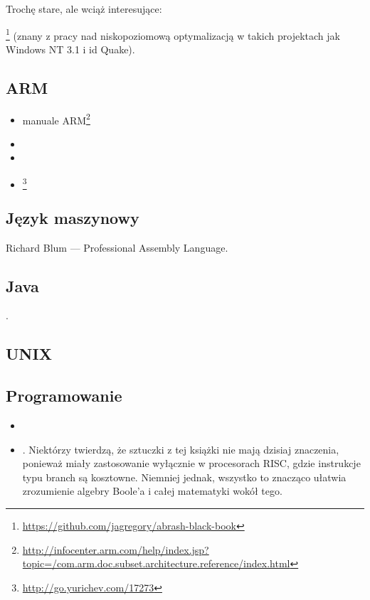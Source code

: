 Trochę stare, ale wciąż interesujące:

\MAbrash\footnote{\AlsoAvailableAs \url{https://github.com/jagregory/abrash-black-book}}
(znany z pracy nad niskopoziomową optymalizacją w takich projektach jak Windows NT 3.1 i id Quake).

\subsection{ARM}

\begin{itemize}
\item manuale ARM\footnote{\AlsoAvailableAs \url{http://infocenter.arm.com/help/index.jsp?topic=/com.arm.doc.subset.architecture.reference/index.html}}

\item \ARMSevenRef

\item \ARMSixFourRefURL

\item \ARMCookBook\footnote{\AlsoAvailableAs \url{http://go.yurichev.com/17273}}
\end{itemize}

\subsection{Język maszynowy}

Richard Blum --- Professional Assembly Language.

\subsection{Java}

\JavaBook.

\subsection{UNIX}

\TAOUP

\subsection{Programowanie}

\begin{itemize}

\item \RobPikePractice

\item \HenryWarren.
Niektórzy twierdzą, że sztuczki z tej książki nie mają dzisiaj znaczenia, ponieważ miały zastosowanie wyłącznie w procesorach \ac{RISC},
gdzie instrukcje typu branch są kosztowne.
Niemniej jednak, wszystko to znacząco ułatwia zrozumienie algebry Boole'a i całej matematyki wokół tego.

\end{itemize}



